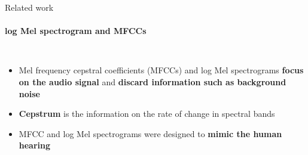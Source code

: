 \documentclass[aspectratio=169, professionalfonts]{beamer}
\begin{document}
\begin{frame}{Related work}
    \framesubtitle{log Mel spectrogram and MFCCs}
    \begin{columns}[T]

            \begin{itemize}
        		\item Mel frequency cepstral coefficients (MFCCs) and log Mel spectrograms \textbf{focus on the audio signal} and \textbf{discard information such as background noise}
        		\item \textbf{Cepstrum} is the information on the rate of change in spectral bands
                \item MFCC and log Mel spectrograms were designed to \textbf{mimic the human hearing}
        	\end{itemize}
        

\end{columns}
\end{frame}
\end{document}
